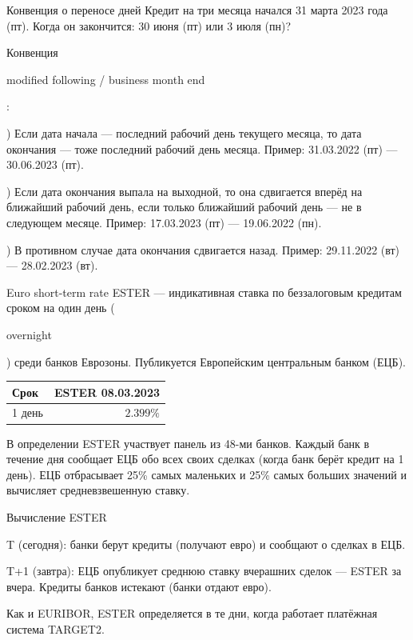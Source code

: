 \documentclass{beamer}
\newcommand{\en}[1]{\begin{otherlanguage}{english}#1\end{otherlanguage}}
\begin{document}
\begin{frame}{Конвенция о переносе дней}
\justify
Кредит на три месяца начался 31 марта 2023 года (пт). Когда он закончится: 30 июня (пт) или 3 июля (пн)?

\justify
Конвенция \en{modified following / business month end}:

) Если дата начала --- последний рабочий день текущего месяца, то дата окончания --- тоже последний рабочий день месяца. Пример: 31.03.2022 (пт) --- 30.06.2023 (пт).

) Если дата окончания выпала на выходной, то она сдвигается вперёд на ближайший 
рабочий день, если только ближайший рабочий день --- не в следующем месяце. Пример: 
17.03.2023 (пт) --- 19.06.2022 (пн).

) В противном случае дата окончания сдвигается назад. Пример: 29.11.2022 (вт) --- 28.02.2023 (вт).
\end{frame}



\begin{frame}{Euro short-term rate}
\justify
\alert{ESTER} --- индикативная ставка по беззалоговым кредитам сроком на один день (\en{overnight}) среди банков Еврозоны. Публикуется Европейским центральным банком (ЕЦБ).

\justify
\centering
\begin{tabular}{l|r}
Срок   & ESTER 08.03.2023 \\ \hline
1 день & $2.399\%$
\end{tabular}

\justify
В определении ESTER участвует панель из 48-ми банков. Каждый банк в течение дня сообщает ЕЦБ обо всех своих сделках (когда банк берёт кредит на 1 день). ЕЦБ отбрасывает 25\% самых маленьких и 25\% самых больших значений и вычисляет средневзвешенную ставку.
\end{frame}



\begin{frame}{Вычисление ESTER}
\justify
\centering
{}

\justify
T (сегодня): банки берут кредиты (получают евро) и сообщают о сделках в ЕЦБ.

T+1 (завтра): ЕЦБ опубликует среднюю ставку вчерашних сделок --- ESTER за вчера. Кредиты банков истекают (банки отдают евро).

\justify
Как и EURIBOR, ESTER определяется в те дни, когда работает платёжная система TARGET2.
\end{frame}
\end{document}
